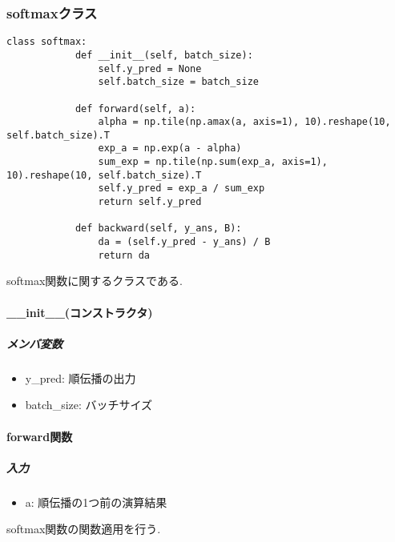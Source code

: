 \documentclass[a4j, titlepage]{jarticle}
\begin{document}
    \subsubsection{softmaxクラス}
        \begin{lstlisting}[caption=ソフトマックス関数の計算 ,label=fuga]
        class softmax:
            def __init__(self, batch_size):
                self.y_pred = None
                self.batch_size = batch_size

            def forward(self, a):
                alpha = np.tile(np.amax(a, axis=1), 10).reshape(10, self.batch_size).T
                exp_a = np.exp(a - alpha)
                sum_exp = np.tile(np.sum(exp_a, axis=1), 10).reshape(10, self.batch_size).T
                self.y_pred = exp_a / sum_exp
                return self.y_pred

            def backward(self, y_ans, B):
                da = (self.y_pred - y_ans) / B
                return da
        \end{lstlisting}
        softmax関数に関するクラスである.
        \paragraph*{\_\_init\_\_(コンストラクタ)}
            \subparagraph*{メンバ変数}
            \begin{itemize}
                \item y\_pred: 順伝播の出力
                \item batch\_size: バッチサイズ
            \end{itemize}
        \paragraph*{forward関数}
            \subparagraph*{入力}
            \begin{itemize}
                \item a: 順伝播の1つ前の演算結果
            \end{itemize}
            softmax関数の関数適用を行う.
\end{document}
